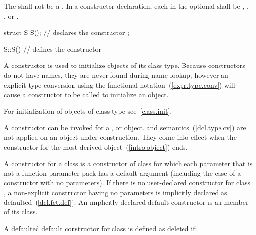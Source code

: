 The  shall not be a . In a constructor
declaration, each  in the optional
 shall be , ,
, or .
\begin{example}

\begin{codeblock}
struct S {
  S();              // declares the constructor
};

S::S() { }          // defines the constructor
\end{codeblock}
\end{example}

\pnum
A constructor is used to initialize objects of its class type.
Because constructors do not have names, they are never found during
name lookup; however an explicit type conversion using the functional
notation~(\ref{expr.type.conv}) will cause a constructor to be called to
initialize an object.
\begin{note}
For initialization of objects of class type see~\ref{class.init}.
\end{note}

\pnum
{}%
%
A constructor can be invoked for a
,
or
object.
%
and
semantics~(\ref{dcl.type.cv}) are not applied on an object under construction.
They come into effect when the constructor for the
most derived object~(\ref{intro.object}) ends.

\pnum
{}%
%
%
A
constructor for a class
is a constructor of class
for which
each parameter
that is not a function parameter pack
has a default argument
(including the case of a constructor with no parameters).
%
If there is no user-declared constructor for class
,
a non-explicit constructor having no parameters is implicitly declared
as defaulted~(\ref{dcl.fct.def}).
An implicitly-declared default constructor is an
member of its class.

\pnum
A defaulted default constructor for class  is defined as deleted if:

